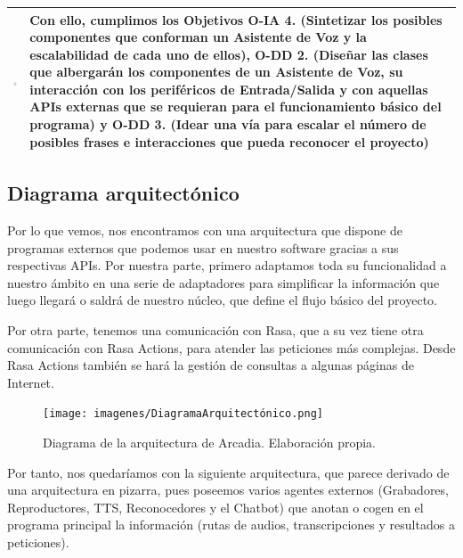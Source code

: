 \begin{table}[H]
	\centering
	\begin{tabularx}{\textwidth}{|>{\columncolor{mintgreen}}c>{\columncolor{mintgreen}}X|}
		\hline
		\includegraphics[width=30pt]{imagenes/Tarea_completada.png} & Con ello, cumplimos los Objetivos \textbf{O-IA 4.} (Sintetizar los posibles componentes que conforman un Asistente de Voz y la escalabilidad de cada uno de ellos), \textbf{O-DD 2.} (Diseñar las clases que albergarán los componentes de un Asistente de Voz, su interacción con los periféricos de Entrada/Salida y con aquellas APIs externas que se requieran para el funcionamiento básico del programa) y \textbf{O-DD 3.} (Idear una vía para escalar el número de posibles frases e interacciones que pueda reconocer el proyecto) \\
		\hline
	\end{tabularx}
\end{table}

\subsection{Diagrama arquitectónico}
Por lo que vemos, nos encontramos con una arquitectura que dispone de programas externos que podemos usar en nuestro software gracias a sus respectivas APIs. Por nuestra parte, primero adaptamos toda su funcionalidad a nuestro ámbito en una serie de adaptadores para simplificar la información que luego llegará o saldrá de nuestro núcleo, que define el flujo básico del proyecto.

Por otra parte, tenemos una comunicación con Rasa, que a su vez tiene otra comunicación con Rasa Actions, para atender las peticiones más complejas. Desde Rasa Actions también se hará la gestión de consultas a algunas páginas de Internet.

\begin{center}
	\begin{figure}[H]
		\texttt{[image: imagenes/DiagramaArquitectónico.png]}
		\caption{Diagrama de la arquitectura de Arcadia. Elaboración propia.}
	\end{figure}
\end{center}

Por tanto, nos quedaríamos con la siguiente arquitectura, que parece derivado de una arquitectura en pizarra, pues poseemos varios agentes externos (Grabadores, Reproductores, TTS, Reconocedores y el Chatbot) que anotan o cogen en el programa principal la información (rutas de audios, transcripciones y resultados a peticiones). 

